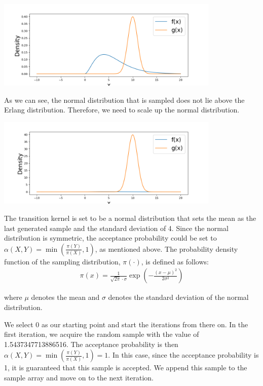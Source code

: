 \begin{center}
\includegraphics[width=0.8\textwidth]{figures/mcmc_example/first_step.png}
\end{center}

As we can see, the normal distribution that is sampled does not lie above the Erlang distribution. Therefore, we need to scale up the normal distribution.

\begin{center}
\includegraphics[width=0.8\textwidth]{figures/mcmc_example/second_step.png}
\end{center}

The transition kernel is set to be a normal distribution that sets the mean as the last generated sample and the standard deviation of 4. Since the normal distribution is symmetric, the acceptance probability could be set to $\alpha(X, Y) = \min (\frac{\pi(Y)}{\pi(X)}, 1)$, as mentioned above. The probability density function of the sampling distribution, $\pi(\cdot)$, is defined as follows:
\begin{align}
\pi(x) = \frac{1}{\sqrt{2\pi} \cdot \sigma}\exp(-\frac{(x-\mu)^2}{2\sigma^2})
\end{align}

where $\mu$ denotes the mean and $\sigma$ denotes the standard deviation of the normal distribution.\linebreak\cite{densityFunction}

We select 0 as our starting point and start the iterations from there on. In the first iteration, we acquire the random sample with the value of 1.5437347713886516. The acceptance probability is then $\alpha(X, Y) = \min (\frac{\pi(Y)}{\pi(X)}, 1) = 1$. In this case, since the acceptance probability is 1, it is guaranteed that this sample is accepted. We append this sample to the sample array and move on to the next iteration.


